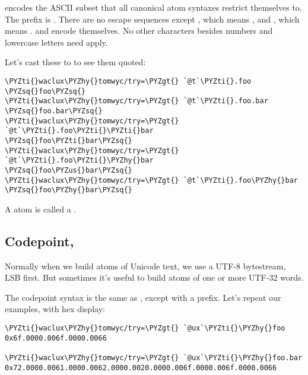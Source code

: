  encodes the ASCII subset that all canonical atom syntaxes
restrict themselves to.  The prefix is .  There are no escape
sequences except \kode{\sig \sig }, which means \kode{\sig }, and \kode{\sig -}, which means
\kode{\_}.  \kode{-} and  encode themselves.  No other characters
besides numbers and lowercase letters need apply.

Let's cast these to  to see them quoted:

\begin{framed_shaded}
\begin{Verbatim}[fontsize=\relsize{-2.5},fontseries=b,commandchars=\\\{\}]
\PYZti{}waclux\PYZhy{}tomwyc/try=\PYZgt{} `@t`\PYZti{}.foo
\PYZsq{}foo\PYZsq{}
\PYZti{}waclux\PYZhy{}tomwyc/try=\PYZgt{} `@t`\PYZti{}.foo.bar
\PYZsq{}foo.bar\PYZsq{}
\PYZti{}waclux\PYZhy{}tomwyc/try=\PYZgt{} `@t`\PYZti{}.foo\PYZti{}\PYZti{}bar
\PYZsq{}foo\PYZti{}bar\PYZsq{}
\PYZti{}waclux\PYZhy{}tomwyc/try=\PYZgt{} `@t`\PYZti{}.foo\PYZti{}\PYZhy{}bar
\PYZsq{}foo\PYZus{}bar\PYZsq{}
\PYZti{}waclux\PYZhy{}tomwyc/try=\PYZgt{} `@t`\PYZti{}.foo\PYZhy{}bar
\PYZsq{}foo\PYZhy{}bar\PYZsq{}
\end{Verbatim}
\end{framed_shaded}
A  atom is called a .

\subsection{Codepoint, }

Normally when we build atoms of Unicode text, we use a UTF-8
bytestream, LSB first.  But sometimes it's useful to build atoms
of one or more UTF-32 words.

The codepoint syntax is the same as , except with a \kode{\sig -}
prefix.  Let's repeat our examples, with hex display:

\begin{framed_shaded}
\begin{Verbatim}[fontsize=\relsize{-2.5},fontseries=b,commandchars=\\\{\}]
\PYZti{}waclux\PYZhy{}tomwyc/try=\PYZgt{} `@ux`\PYZti{}\PYZhy{}foo
0x6f.0000.006f.0000.0066

\PYZti{}waclux\PYZhy{}tomwyc/try=\PYZgt{} `@ux`\PYZti{}\PYZhy{}foo.bar
0x72.0000.0061.0000.0062.0000.0020.0000.006f.0000.006f.0000.0066
\end{Verbatim}
\end{framed_shaded}

